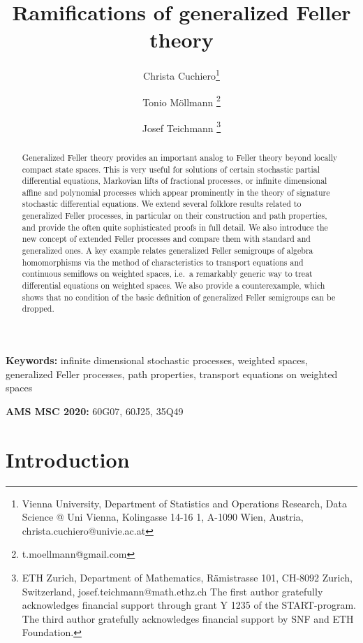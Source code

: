 \documentclass[a4paper,12pt]{article}
\title{Ramifications of generalized Feller theory}
\author{Christa Cuchiero\thanks{Vienna University, Department of Statistics and Operations Research, Data Science @ Uni Vienna, Kolingasse 14-16 1, A-1090 Wien, Austria, christa.cuchiero@univie.ac.at} \and Tonio M\"ollmann \thanks{ t.moellmann@gmail.com} \and Josef Teichmann \thanks{ETH Zurich,  Department of Mathematics, Rämistrasse 101, CH-8092 Zurich, Switzerland, josef.teichmann@math.ethz.ch\newline
The first author gratefully acknowledges financial support through grant Y 1235 of the START-program.
			The third author gratefully acknowledges financial support by SNF and ETH Foundation.}}
\date{}
\theoremstyle{definition}
\theoremstyle{remark}
\numberwithin{equation}{section}
\numberwithin{theorem}{section}
\begin{document}
\maketitle

\begin{abstract}
Generalized Feller theory provides an important analog to Feller theory beyond locally compact state spaces. This is very useful for solutions  of certain stochastic partial differential equations, Markovian lifts of fractional processes, or infinite dimensional affine and polynomial processes which appear prominently in the theory of signature stochastic differential equations. We extend several folklore results related to generalized Feller processes, in particular on their construction and path properties, and  provide the often quite sophisticated proofs in full detail.
We also introduce the new concept of extended Feller processes and compare them with standard and generalized ones.
A key example relates generalized Feller semigroups of  algebra homomorphisms via the method of characteristics to transport equations and continuous semiflows on weighted spaces, i.e.~a remarkably generic way to treat differential equations on weighted spaces. We also provide a counterexample, which shows that no condition of the basic definition of generalized Feller semigroups can be dropped.
\end{abstract}



\textbf{Keywords:} infinite dimensional stochastic processes, weighted spaces, generalized Feller processes, path properties, transport equations on weighted spaces

\textbf{AMS MSC 2020:} 60G07, 60J25, 35Q49

\tableofcontents

\section{Introduction}
\end{document}
